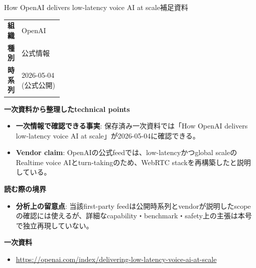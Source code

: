 \begin{technicalnote}{How OpenAI delivers low-latency voice AI at scale}{補足資料}
\begingroup
\begin{tabularx}{\linewidth}{@{}>{\bfseries}p{0.22\linewidth}X@{}}
組織 & OpenAI \\
種別 & 公式情報 \\
時系列 & 2026-05-04 (公式公開) \\
\end{tabularx}
\smallskip
{\bfseries 一次資料から整理したtechnical points}
\begin{itemize}[leftmargin=1.5em,itemsep=0.35em]
\item \textbf{一次情報で確認できる事実}: 保存済み一次資料では「How OpenAI delivers low-latency voice AI at scale」が2026-05-04に確認できる。
\end{itemize}
\begin{minipage}{\linewidth}
\begin{itemize}[leftmargin=1.5em,itemsep=0.35em]
\item \textbf{Vendor claim}: OpenAIの公式feedでは、low-latencyかつglobal scaleのRealtime voice AIとturn-takingのため、WebRTC stackを再構築したと説明している。
\end{itemize}
{\bfseries 読む際の境界}
\begin{itemize}[leftmargin=1.5em,itemsep=0.35em]
\item \textbf{分析上の留意点}: 当該first-party feedは公開時系列とvendorが説明したscopeの確認には使えるが、詳細なcapability・benchmark・safety上の主張は本号で独立再現していない。
\end{itemize}
\begin{samepage}
{\bfseries 一次資料}
\begingroup\sloppy
\begin{itemize}[leftmargin=1.5em,itemsep=0.25em]
\item {\scriptsize\url{https://openai.com/index/delivering-low-latency-voice-ai-at-scale}}
\end{itemize}
\endgroup
\end{samepage}
\end{minipage}
\endgroup
\end{technicalnote}
\medskip
